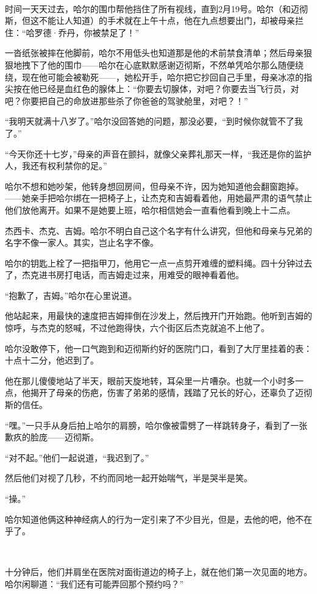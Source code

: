 \documentclass[../main]{subfiles}
\begin{document}
~\

时间一天天过去，哈尔的围巾帮他挡住了所有视线，直到2月19号。哈尔（和迈彻斯，但这不能让人知道）的手术就在上午十点，他在九点想要出门，却被母亲拦住：“哈罗德·乔丹，你被禁足了！”

一沓纸张被摔在他脚前，哈尔不用低头也知道那是他的术前禁食清单；然后母亲狠狠地拽下了他的围巾——哈尔在心底默默感谢迈彻斯，不然单凭哈尔那么随便绕绕，现在他可能会被勒死——，她松开手，哈尔把它抄回自己手里，母亲冰凉的指尖按在他已经是血红色的腺体上：“你要去切腺体，对吧？你要去当飞行员，对吧？你要把自己的命放进那些杀了你爸爸的驾驶舱里，对吧？！”

“我明天就满十八岁了。”哈尔没回答她的问题，那没必要，“到时候你就管不了我了。”

“今天你还十七岁，”母亲的声音在颤抖，就像父亲葬礼那天一样，“我还是你的监护人，我还有权利禁你的足。”

哈尔不想和她吵架，他转身想回房间，但母亲不许，因为她知道他会翻窗跑掉。——她亲手把哈尔绑在一把椅子上，让杰克和吉姆看着他，用她最严肃的语气禁止他们放他离开。如果不是她要上班，哈尔相信她会一直看他看到晚上十二点。

杰西卡、杰克、吉姆。哈尔不明白自己这个名字有什么讲究，但他和母亲与兄弟的名字不像一家人。其实，岂止名字不像。

哈尔的钥匙上栓了一把指甲刀，他用它一点一点剪开难缠的塑料绳。四十分钟过去了，杰克进书房打电话，而吉姆走过来，用难受的眼神看着他。

“抱歉了，吉姆。”哈尔在心里说道。

他站起来，用最快的速度把吉姆摔倒在沙发上，然后拽开门开始跑。他听到吉姆的惊呼，与杰克的怒喊，不过他跑得快，六个街区后杰克就追不上他了。

哈尔没敢停下，他一口气跑到和迈彻斯约好的医院门口，看到了大厅里挂着的表：十点十二分，他迟到了。

他在那儿傻傻地站了半天，眼前天旋地转，耳朵里一片嘈杂。也就一个小时多一点，他揭开了母亲的伤疤，伤害了弟弟的感情，践踏了兄长的好心，还辜负了迈彻斯的信任。

“嘿。”一只手从身后拍上哈尔的肩膀，哈尔像被雷劈了一样跳转身子，看到了一张歉疚的脸庞——迈彻斯。

“对不起。”他们一起说道，“我迟到了。”

然后他们对视了几秒，不约而同地一起开始喘气，半是哭半是笑。

“操。”

哈尔知道他俩这种神经病人的行为一定引来了不少目光，但是，去他的吧，他不在乎了。

~\

十分钟后，他们并肩坐在医院对面街道边的椅子上，就在他们第一次见面的地方。哈尔闲聊道：“我们还有可能弄回那个预约吗？”
\end{document}
